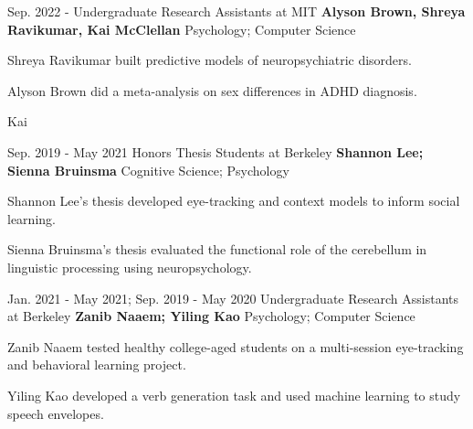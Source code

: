 

\begin{cventries}

  \cventry
    {Sep. 2022 - } %
    {Undergraduate Research Assistants at MIT} %
    {\textbf{Alyson Brown, Shreya Ravikumar, Kai McClellan}} 
    {Psychology; Computer Science} %
    {
      \begin{cvitems} %
        \item {Shreya Ravikumar built predictive models of neuropsychiatric disorders.}
        \item {Alyson Brown did a meta-analysis on sex differences in ADHD diagnosis.}
        \item {Kai }
      \end{cvitems}
    }
    

 
  \cventry
    {Sep. 2019 - May 2021} %
    {Honors Thesis Students at Berkeley} %
    {\textbf{Shannon Lee; Sienna Bruinsma}} 
    {Cognitive Science; Psychology} %
    {
      \begin{cvitems} %
        \item {Shannon Lee's thesis developed eye-tracking and context models to inform social learning.}
        \item {Sienna Bruinsma's thesis evaluated the functional role of the cerebellum in linguistic processing using neuropsychology.}
      \end{cvitems}
    }
    
    
  \cventry
    {Jan. 2021 - May 2021; Sep. 2019 - May 2020} %
    {Undergraduate Research Assistants at Berkeley} %
   	{\textbf{Zanib Naaem; Yiling Kao}}
   	{Psychology; Computer Science}
    {
      \begin{cvitems} %
        \item {Zanib Naaem tested healthy college-aged students on a multi-session eye-tracking and behavioral learning project.}
        \item {Yiling Kao developed a verb generation task and used machine learning to study speech envelopes.}
      \end{cvitems}
    }
    

\end{cventries}
